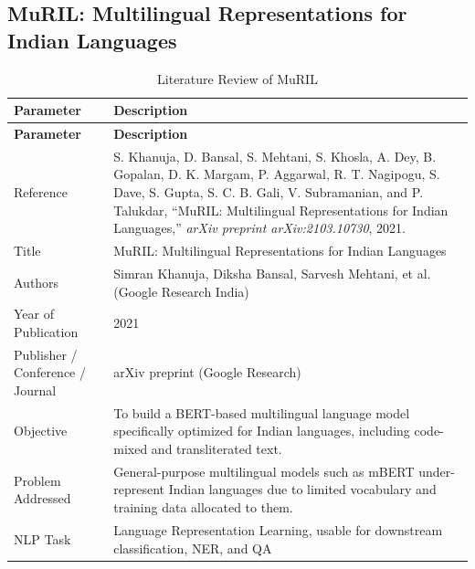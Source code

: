 \subsection{MuRIL: Multilingual Representations for Indian Languages}

\def\PaperTitle{MuRIL}
\def\PaperLabel{tab:paper2}

\renewcommand{\arraystretch}{1.4}

\begin{longtable}{|p{5cm}|p{10cm}|}
\caption{Literature Review of MuRIL}
\label{tab:paper2}\\

\hline
\textbf{Parameter} & \textbf{Description} \\
\hline
\endfirsthead

\hline
\textbf{Parameter} & \textbf{Description} \\
\hline
\endhead

Reference &
S. Khanuja, D. Bansal, S. Mehtani, S. Khosla, A. Dey, B. Gopalan, D. K. Margam, P. Aggarwal, R. T. Nagipogu, S. Dave, S. Gupta, S. C. B. Gali, V. Subramanian, and P. Talukdar, ``MuRIL: Multilingual Representations for Indian Languages,'' \textit{arXiv preprint arXiv:2103.10730}, 2021.
\\ \hline

Title &
MuRIL: Multilingual Representations for Indian Languages
\\ \hline

Authors &
Simran Khanuja, Diksha Bansal, Sarvesh Mehtani, et al. (Google Research India)
\\ \hline

Year of Publication &
2021
\\ \hline

Publisher / Conference / Journal &
arXiv preprint (Google Research)
\\ \hline

Objective &
To build a BERT-based multilingual language model specifically optimized for Indian languages, including code-mixed and transliterated text.
\\ \hline

Problem Addressed &
General-purpose multilingual models such as mBERT under-represent Indian languages due to limited vocabulary and training data allocated to them.
\\ \hline

NLP Task &
Language Representation Learning, usable for downstream classification, NER, and QA
\\ \hline


\end{longtable}
